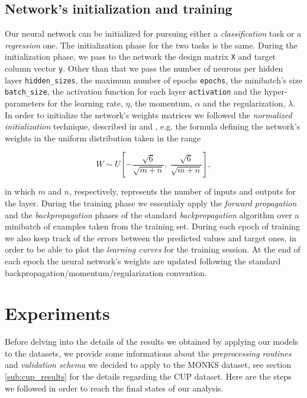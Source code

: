 \documentclass[11pt,twoside]{article}
\begin{document}
        \subsection{Network's initialization and training} %
        \label{sub:the_training_algorithm}
        Our neural network can be initialized for pursuing either a \textit{classification} task or a
        \textit{regression} one. The initialization phase for the two tasks is the same.
        During the initialization phase, we pass to the network the design matrix \texttt{X} and target column
        vector \texttt{y}. Other than that we pass the number of neurons per hidden layer
        \texttt{hidden\_sizes}, the maximum number of epochs \texttt{epochs}, the minibatch's size
        \texttt{batch\_size}, the activation function for each layer \texttt{activation} and the hyper-parameters
        for the learning rate, \texttt{$\eta$}, the momentum, \texttt{$\alpha$} and the regularization,
        \texttt{$\lambda$}. In order to initialize the network's weights matrices we followed the
        \textit{normalized initialization} technique, described in \cite{deep_learning} and
        \cite{initialization}, e.g. the formula defining the network's weights in the uniform distribution
        taken in the range

        \begin{equation*}
             W \sim U \left [ - \frac{\sqrt{6}}{\sqrt{m + n}}, \ \frac{\sqrt{6}}{\sqrt{m + n}}  \right ],
        \end{equation*}

        in which $m$ and $n$, respectively, represents the number of inputs and outputs for the layer.
        During the training phase we essentialy apply the \textit{forward propagation} and the
        \textit{backpropagation} phases of the standard \textit{backpropagation} algorithm over a minibatch of
        examples taken from the training set. During each epoch of training we also keep track of the errors
        between the predicted values and target ones, in order to be able to plot the \textit{learning curves}
        for the training session. At the end of each epoch the neural network's weights are updated following
        the standard backpropagation/momentum/regularization convention.


\section{Experiments} %
\label{sec:experiments}
    Before delving into the details of the results we obtained by applying our models to the datasets, we
    provide some informations about the \textit{preprocessing routines} and \textit{validation schema} we
    decided to apply to the MONKS dataset, see section \ref{sub:cup_results} for the details regarding the
    CUP dataset. Here are the steps we followed in order to reach the final states of our analysis.
\end{document}
